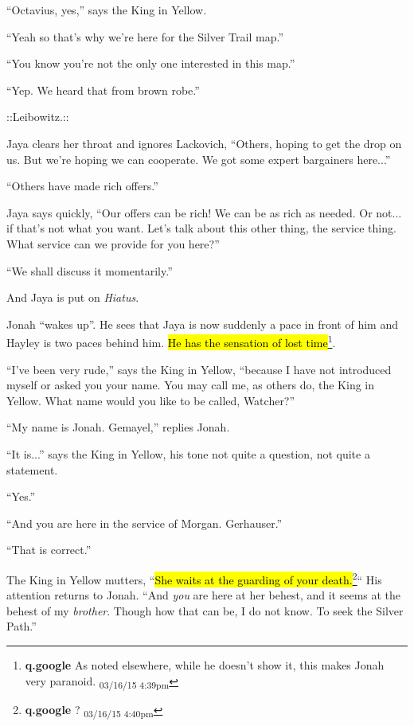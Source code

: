``Octavius, yes,'' says the King in Yellow.

``Yeah so that's why we're here for the Silver Trail map.''

``You know you're not the only one interested in this map.''

``Yep.  We heard that from brown robe.''

 {\color[RGB]{74,134,232}::Leibowitz.::} 

Jaya clears her throat and ignores Lackovich, ``Others, hoping to get the drop on us.  But we're hoping we can cooperate. We got some expert bargainers here...''

``Others have made rich offers.''

Jaya says quickly, ``Our offers can be rich!  We can be as rich as needed.  Or not... if that's not what you want.  Let's talk about this other thing, the service thing. What service can we provide for you here?''

``We shall discuss it momentarily.''



And Jaya is put on \textit{Hiatus}.





Jonah ``wakes up''.  He sees that Jaya is now suddenly a pace in front of him and Hayley is two paces behind him.  \hl{He has the sensation of lost time}\footnote{\textbf{q.google }As noted elsewhere, while he doesn't show it, this makes Jonah very paranoid. \textsubscript{03/16/15 4:39pm}}.



``I've been very rude,'' says the King in Yellow, ``because I have not introduced myself or asked you your name.  You may call me, as others do, the King in Yellow.  What name would you like to be called, Watcher?''

``My name is Jonah.  Gemayel,'' replies Jonah.

``It is...'' says the King in Yellow, his tone not quite a question, not quite a statement.

``Yes.''

``And you are here in the service of Morgan.  Gerhauser.''

``That is correct.''

The King in Yellow mutters, ``\hl{She waits at the guarding of your death.}\footnote{\textbf{q.google }? \textsubscript{03/16/15 4:40pm}}``  His attention returns to Jonah.  ``And \textit{you} are here at her behest, and it seems at the behest of my \textit{brother}.  Though how that can be, I do not know.  To seek the Silver Path.''

